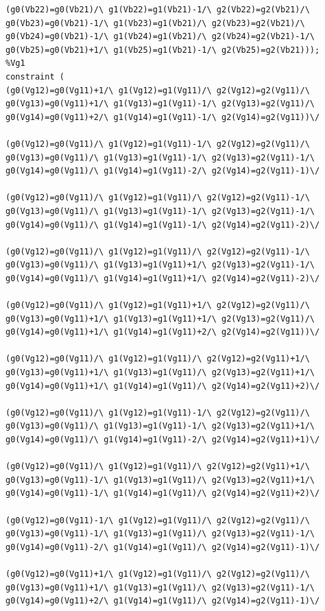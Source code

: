 \begin{appendices}
\begin{lstlisting}
(g0(Vb22)=g0(Vb21)/\ g1(Vb22)=g1(Vb21)-1/\ g2(Vb22)=g2(Vb21)/\ g0(Vb23)=g0(Vb21)-1/\ g1(Vb23)=g1(Vb21)/\ g2(Vb23)=g2(Vb21)/\ g0(Vb24)=g0(Vb21)-1/\ g1(Vb24)=g1(Vb21)/\ g2(Vb24)=g2(Vb21)-1/\ g0(Vb25)=g0(Vb21)+1/\ g1(Vb25)=g1(Vb21)-1/\ g2(Vb25)=g2(Vb21)));
%Vg1
constraint (
(g0(Vg12)=g0(Vg11)+1/\ g1(Vg12)=g1(Vg11)/\ g2(Vg12)=g2(Vg11)/\ g0(Vg13)=g0(Vg11)+1/\ g1(Vg13)=g1(Vg11)-1/\ g2(Vg13)=g2(Vg11)/\ g0(Vg14)=g0(Vg11)+2/\ g1(Vg14)=g1(Vg11)-1/\ g2(Vg14)=g2(Vg11))\/ 

(g0(Vg12)=g0(Vg11)/\ g1(Vg12)=g1(Vg11)-1/\ g2(Vg12)=g2(Vg11)/\ g0(Vg13)=g0(Vg11)/\ g1(Vg13)=g1(Vg11)-1/\ g2(Vg13)=g2(Vg11)-1/\ g0(Vg14)=g0(Vg11)/\ g1(Vg14)=g1(Vg11)-2/\ g2(Vg14)=g2(Vg11)-1)\/ 

(g0(Vg12)=g0(Vg11)/\ g1(Vg12)=g1(Vg11)/\ g2(Vg12)=g2(Vg11)-1/\ g0(Vg13)=g0(Vg11)/\ g1(Vg13)=g1(Vg11)-1/\ g2(Vg13)=g2(Vg11)-1/\ g0(Vg14)=g0(Vg11)/\ g1(Vg14)=g1(Vg11)-1/\ g2(Vg14)=g2(Vg11)-2)\/ 

(g0(Vg12)=g0(Vg11)/\ g1(Vg12)=g1(Vg11)/\ g2(Vg12)=g2(Vg11)-1/\ g0(Vg13)=g0(Vg11)/\ g1(Vg13)=g1(Vg11)+1/\ g2(Vg13)=g2(Vg11)-1/\ g0(Vg14)=g0(Vg11)/\ g1(Vg14)=g1(Vg11)+1/\ g2(Vg14)=g2(Vg11)-2)\/ 

(g0(Vg12)=g0(Vg11)/\ g1(Vg12)=g1(Vg11)+1/\ g2(Vg12)=g2(Vg11)/\ g0(Vg13)=g0(Vg11)+1/\ g1(Vg13)=g1(Vg11)+1/\ g2(Vg13)=g2(Vg11)/\ g0(Vg14)=g0(Vg11)+1/\ g1(Vg14)=g1(Vg11)+2/\ g2(Vg14)=g2(Vg11))\/ 

(g0(Vg12)=g0(Vg11)/\ g1(Vg12)=g1(Vg11)/\ g2(Vg12)=g2(Vg11)+1/\ g0(Vg13)=g0(Vg11)+1/\ g1(Vg13)=g1(Vg11)/\ g2(Vg13)=g2(Vg11)+1/\ g0(Vg14)=g0(Vg11)+1/\ g1(Vg14)=g1(Vg11)/\ g2(Vg14)=g2(Vg11)+2)\/ 

(g0(Vg12)=g0(Vg11)/\ g1(Vg12)=g1(Vg11)-1/\ g2(Vg12)=g2(Vg11)/\ g0(Vg13)=g0(Vg11)/\ g1(Vg13)=g1(Vg11)-1/\ g2(Vg13)=g2(Vg11)+1/\ g0(Vg14)=g0(Vg11)/\ g1(Vg14)=g1(Vg11)-2/\ g2(Vg14)=g2(Vg11)+1)\/ 

(g0(Vg12)=g0(Vg11)/\ g1(Vg12)=g1(Vg11)/\ g2(Vg12)=g2(Vg11)+1/\ g0(Vg13)=g0(Vg11)-1/\ g1(Vg13)=g1(Vg11)/\ g2(Vg13)=g2(Vg11)+1/\ g0(Vg14)=g0(Vg11)-1/\ g1(Vg14)=g1(Vg11)/\ g2(Vg14)=g2(Vg11)+2)\/ 

(g0(Vg12)=g0(Vg11)-1/\ g1(Vg12)=g1(Vg11)/\ g2(Vg12)=g2(Vg11)/\ g0(Vg13)=g0(Vg11)-1/\ g1(Vg13)=g1(Vg11)/\ g2(Vg13)=g2(Vg11)-1/\ g0(Vg14)=g0(Vg11)-2/\ g1(Vg14)=g1(Vg11)/\ g2(Vg14)=g2(Vg11)-1)\/ 

(g0(Vg12)=g0(Vg11)+1/\ g1(Vg12)=g1(Vg11)/\ g2(Vg12)=g2(Vg11)/\ g0(Vg13)=g0(Vg11)+1/\ g1(Vg13)=g1(Vg11)/\ g2(Vg13)=g2(Vg11)-1/\ g0(Vg14)=g0(Vg11)+2/\ g1(Vg14)=g1(Vg11)/\ g2(Vg14)=g2(Vg11)-1)\/ 


\end{lstlisting}
\end{appendices}
